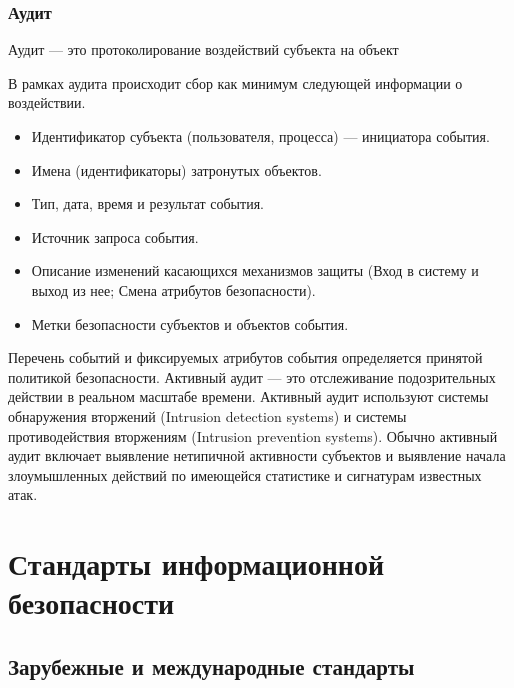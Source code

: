 \begin{frame}
\frametitle{Аудит}
\begin{definition}%
\alert{Аудит} --- это протоколирование воздействий субъекта на объект
\end{definition}
В рамках аудита происходит сбор как минимум следующей информации о воздействии.
\begin{itemize}
    \item Идентификатор субъекта (пользователя, процесса) --- инициатора события.
    \item Имена (идентификаторы) затронутых объектов.
    \item Тип, дата, время и результат события.
    \item Источник запроса события.
    \item Описание изменений касающихся механизмов защиты (Вход в систему и выход из нее; Смена атрибутов безопасности).
    \item Метки безопасности субъектов и объектов события.
\end{itemize}
\end{frame}

Перечень событий и фиксируемых атрибутов события определяется принятой политикой безопасности. Активный аудит --- это отслеживание подозрительных действии в реальном масштабе времени. Активный аудит используют системы обнаружения вторжений (Intrusion detection systems) и системы противодействия вторжениям (Intrusion prevention systems). Обычно активный аудит включает выявление нетипичной активности субъектов и выявление начала злоумышленных действий по имеющейся статистике и сигнатурам известных атак.


\section{Стандарты информационной безопасности}


\subsection{Зарубежные и международные стандарты}

